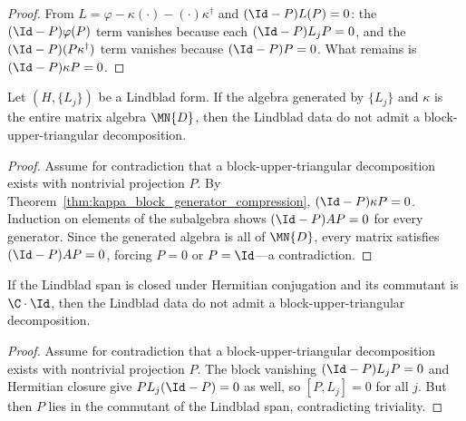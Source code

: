 \begin{proof}\leanok
    From $L=\varphi-\kappa(\cdot)-(\cdot)\kappa^\dagger$ and
    $(\Id-P)L(P)=0$: the $(\Id-P)\varphi(P)$ term vanishes because each
    $(\Id-P)L_jP=0$, and the $(\Id-P)(P\kappa^\dagger)$ term vanishes
    because $(\Id-P)P=0$. What remains is $(\Id-P)\kappa P=0$.
\end{proof}

\begin{theorem}%
    \label{thm:full_algebra_gen_no_block_ut}
    \leanok
    Let $(H,\{L_j\})$ be a Lindblad form.
    If the algebra generated by $\{L_j\}$ and $\kappa$ is the entire
    matrix algebra $\MN{D}$, then the Lindblad data do not admit a
    block-upper-triangular decomposition.
\end{theorem}

\begin{proof}\leanok
    Assume for contradiction that a block-upper-triangular decomposition
    exists with nontrivial projection $P$.
    By Theorem~\ref{thm:kappa_block_generator_compression},
    $(\Id-P)\kappa P=0$.
    Induction on elements of the subalgebra shows
    $(\Id-P)AP=0$ for every generator. Since the generated algebra is
    all of $\MN{D}$, every matrix satisfies $(\Id-P)AP=0$, forcing
    $P=0$ or $P=\Id$---a contradiction.
\end{proof}

\begin{theorem}%
    \label{thm:herm_span_trivial_commutant_no_block_ut}
    \leanok
    If the Lindblad span is closed under Hermitian conjugation and its
    commutant is $\C\cdot\Id$, then the Lindblad data do not admit a
    block-upper-triangular decomposition.
\end{theorem}

\begin{proof}\leanok
    Assume for contradiction that a block-upper-triangular decomposition
    exists with nontrivial projection $P$. The block vanishing
    $(\Id-P)L_jP=0$ and Hermitian closure give $PL_j(\Id-P)=0$ as
    well, so $[P,L_j]=0$ for all $j$. But then $P$ lies in the
    commutant of the Lindblad span, contradicting triviality.
\end{proof}

